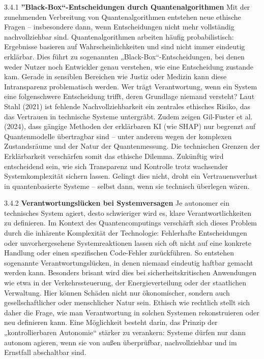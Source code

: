 {3.4.1 \textbf{”Black-Box“-Entscheidungen durch Quantenalgorithmen}
Mit der zunehmenden Verbreitung von Quantenalgorithmen entstehen neue ethische Fragen – insbesondere dann, wenn Entscheidungen nicht mehr vollständig nachvollziehbar sind. Quantenalgorithmen arbeiten häufig probabilistisch: Ergebnisse basieren auf Wahrscheinlichkeiten und sind nicht immer eindeutig erklärbar. Dies führt zu sogenannten „Black-Box“-Entscheidungen, bei denen weder Nutzer noch Entwickler genau verstehen, wie eine Entscheidung zustande kam.
Gerade in sensiblen Bereichen wie Justiz oder Medizin kann diese Intransparenz problematisch werden. Wer trägt Verantwortung, wenn ein System eine folgenschwere Entscheidung trifft, deren Grundlage niemand versteht? Laut Stahl (2021) ist fehlende Nachvollziehbarkeit ein zentrales ethisches Risiko, das das Vertrauen in technische Systeme untergräbt.\cite{stahl_artificial_2021}
Zudem zeigen Gil-Fuster et al. (2024), dass gängige Methoden der erklärbaren KI (wie SHAP) nur begrenzt auf Quantenmodelle übertragbar sind – unter anderem wegen der komplexen Zustandsräume und der Natur der Quantenmessung. Die technischen Grenzen der Erklärbarkeit verschärfen somit das ethische Dilemma.\cite{gil-fuster_opportunities_2024}
Zukünftig wird entscheidend sein, wie sich Transparenz und Kontrolle trotz wachsender Systemkomplexität sichern lassen. Gelingt dies nicht, droht ein Vertrauensverlust in quantenbasierte Systeme – selbst dann, wenn sie technisch überlegen wären.

 

 3.4.2 \textbf{Verantwortungslücken bei Systemversagen}
 Je autonomer ein technisches System agiert, desto schwieriger wird es, klare Verantwortlichkeiten zu definieren. Im Kontext des Quantencomputings verschärft sich dieses Problem durch die inhärente Komplexität der Technologie: Fehlerhafte Entscheidungen oder unvorhergesehene Systemreaktionen lassen sich oft nicht auf eine konkrete Handlung oder einen spezifischen Code-Fehler zurückführen. So entstehen sogenannte Verantwortungslücken, in denen niemand eindeutig haftbar gemacht werden kann.
Besonders brisant wird dies bei sicherheitskritischen Anwendungen wie etwa in der Verkehrssteuerung, der Energieverteilung oder der staatlichen Verwaltung. Hier können Schäden nicht nur ökonomischer, sondern auch gesellschaftlicher oder menschlicher Natur sein. Ethisch wie rechtlich stellt sich daher die Frage, wie man Verantwortung in solchen Systemen rekonstruieren oder neu definieren kann. Eine Möglichkeit besteht darin, das Prinzip der „kontrollierbaren Autonomie“ stärker zu verankern: Systeme dürfen nur dann autonom agieren, wenn sie von außen überprüfbar, nachvollziehbar und im Ernstfall abschaltbar sind\cite{floridi_ai4peopleethical_2018}.
 
}
